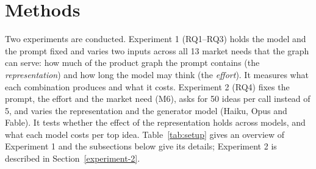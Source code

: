 \hypertarget{methods}{%
\section{Methods}\label{methods}}
Two experiments are conducted. Experiment 1 (RQ1--RQ3) holds the model and the prompt fixed and varies two inputs across all 13 market needs that the graph can serve: how much of the product graph the prompt contains (the \emph{representation}) and how long the model may think (the \emph{effort}). It measures what each combination produces and what it costs. Experiment 2 (RQ4) fixes the prompt, the effort and the market need (M6), asks for 50 ideas per call instead of 5, and varies the representation and the generator model (Haiku, Opus and Fable). It tests whether the effect of the representation holds across models, and what each model costs per top idea. Table~\ref{tab:setup} gives an overview of Experiment 1 and the subsections below give its details; Experiment 2 is described in Section~\ref{experiment-2}.

